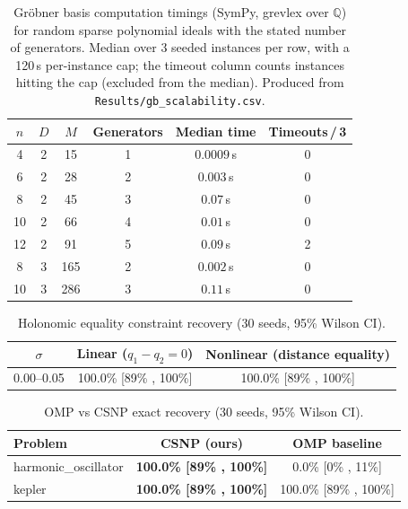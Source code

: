 \documentclass{article}
\begin{document}
\begin{table}[ht]
\centering
\caption{Gr\"{o}bner basis computation timings (SymPy, grevlex over $\mathbb{Q}$) for random sparse polynomial ideals with the stated number of generators. Median over 3 seeded instances per row, with a 120\,s per-instance cap; the timeout column counts instances hitting the cap (excluded from the median). Produced from \texttt{Results/gb\_scalability.csv}.}
\label{tab:gb-scalability}
\begin{tabular}{cccccc}
\toprule
$n$ & $D$ & $M$ & Generators & Median time & Timeouts\,/\,3\\
\midrule
4 & 2 & 15 & 1 & $0.0009$\,s & 0\\
6 & 2 & 28 & 2 & $0.003$\,s & 0\\
8 & 2 & 45 & 3 & $0.07$\,s & 0\\
10 & 2 & 66 & 4 & $0.01$\,s & 0\\
12 & 2 & 91 & 5 & $0.09$\,s & 2\\
8 & 3 & 165 & 2 & $0.002$\,s & 0\\
10 & 3 & 286 & 3 & $0.11$\,s & 0\\
\bottomrule
\end{tabular}
\end{table}


\begin{table}[ht]
\centering
\caption{Holonomic equality constraint recovery (30 seeds, 95\% Wilson CI).}
\label{tab:holonomic}
\begin{tabular}{ccc}
\toprule
$\sigma$ & \textbf{Linear ($q_1-q_2=0$)} & \textbf{Nonlinear (distance equality)} \\
\midrule
0.00--0.05 & 100.0\% [89\% , 100\%] & 100.0\% [89\% , 100\%] \\
\bottomrule
\end{tabular}
\end{table}


\begin{table}[ht]
\centering
\caption{OMP vs CSNP exact recovery (30 seeds, 95\% Wilson CI).}
\label{tab:omp}
\begin{tabular}{lcc}
\toprule
\textbf{Problem} & \textbf{CSNP (ours)} & \textbf{OMP baseline} \\
\midrule
harmonic\_oscillator & \textbf{100.0\% [89\% , 100\%]} & 0.0\% [0\% , 11\%] \\
kepler & \textbf{100.0\% [89\% , 100\%]} & 100.0\% [89\% , 100\%] \\
\bottomrule
\end{tabular}
\end{table}
\end{document}
